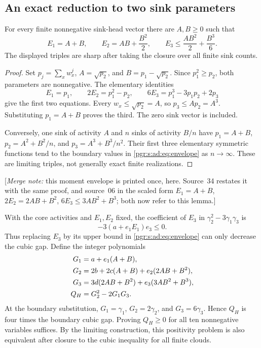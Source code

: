 \documentclass[11pt]{article}
\numberwithin{equation}{section}
\theoremstyle{definition}\newtheorem{definition}[theorem]{Definition}\newtheorem{remark}[theorem]{Remark}
\newcommand{\mnote}[1]{[\textit{Merge note:} #1]}
\begin{document}
\subsection{An exact reduction to two sink parameters}
\begin{lemma}\label{pgr:s:ad:lem:moments}
For every finite nonnegative sink-head vector there are $A,B\ge0$ such that
\begin{equation}\label{pgr:s:ad:eq:envelope}
 E_1=A+B,\qquad E_2=AB+\frac{B^2}{2},\qquad
 E_3\le\frac{AB^2}{2}+\frac{B^3}{6}.
\end{equation}
The displayed triples are sharp after taking the closure over all finite sink counts.
\end{lemma}
\begin{proof}
Set $p_j=\sum_x w_x^j$, $A=\sqrt{p_2}$, and $B=p_1-\sqrt{p_2}$. Since $p_1^2\ge p_2$, both parameters are nonnegative. The elementary identities
\[
 E_1=p_1,\qquad 2E_2=p_1^2-p_2,\qquad
 6E_3=p_1^3-3p_1p_2+2p_3
\]
give the first two equations. Every $w_x\le\sqrt{p_2}=A$, so $p_3\le A p_2=A^3$. Substituting $p_1=A+B$ proves the third. The zero sink vector is included.

Conversely, one sink of activity $A$ and $n$ sinks of activity $B/n$ have $p_1=A+B$, $p_2=A^2+B^2/n$, and $p_3=A^3+B^3/n^2$. Their first three elementary symmetric functions tend to the boundary values in \eqref{pgr:s:ad:eq:envelope} as $n\to\infty$. These are limiting triples, not generally exact finite realizations.
\end{proof}


\mnote{this moment envelope is printed once, here. Source~34 restates it
with the same proof, and source~06 in the scaled form
$E_1=A+B$, $2E_2=2AB+B^2$, $6E_3\le3AB^2+B^3$; both now refer to this
lemma.}

With the core activities and $E_1,E_2$ fixed, the coefficient of $E_3$ in $\gamma_2^2-3\gamma_1\gamma_3$ is
\[
 -3(a+e_1E_1)e_3\le0.
\]
Thus replacing $E_3$ by its upper bound in \eqref{pgr:s:ad:eq:envelope} can only decrease the cubic gap. Define the integer polynomials
\begin{align}
 G_1&=a+e_1(A+B),\notag\\
 G_2&=2b+2c(A+B)+e_2(2AB+B^2),\label{pgr:s:ad:eq:G}\\
 G_3&=3d(2AB+B^2)+e_3(3AB^2+B^3),\notag\\
 Q_H&=G_2^2-2G_1G_3.\label{pgr:s:ad:eq:P}
\end{align}
At the boundary substitution, $G_1=\gamma_1$, $G_2=2\gamma_2$, and $G_3=6\gamma_3$. Hence $Q_H$ is four times the boundary cubic gap. Proving $Q_H\ge0$ for all ten nonnegative variables suffices. By the limiting construction, this positivity problem is also equivalent after closure to the cubic inequality for all finite clouds.
\end{document}
